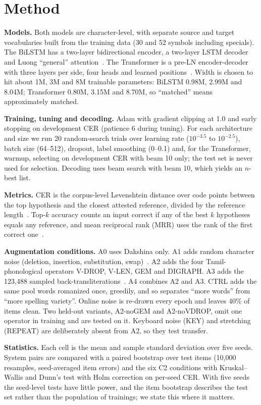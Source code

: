 \section{Method}
\label{sec:method}
\textbf{Models.}
Both models are character-level, with separate source and target vocabularies built from the training data (30 and 52 symbols including specials).
The BiLSTM has a two-layer bidirectional encoder, a two-layer LSTM decoder and Luong ``general'' attention~\cite{luong2015effective,bahdanau2015neural}.
The Transformer is a pre-LN encoder-decoder with three layers per side, four heads and learned positions~\cite{vaswani2017attention}.
Width is chosen to hit about 1M, 3M and 8M trainable parameters: BiLSTM 0.98M, 2.99M and 8.04M; Transformer 0.80M, 3.15M and 8.70M, so ``matched'' means approximately matched.

\textbf{Training, tuning and decoding.}
Adam with gradient clipping at 1.0 and early stopping on development CER (patience 6 during tuning).
For each architecture and size we run 20 random-search trials over learning rate ($10^{-3.5}$ to $10^{-2.5}$), batch size (64--512), dropout, label smoothing (0--0.1) and, for the Transformer, warmup, selecting on development CER with beam 10 only; the test set is never used for selection.
Decoding uses beam search with beam 10, which yields an $n$-best list.

\textbf{Metrics.}
CER is the corpus-level Levenshtein distance over code points between the top hypothesis and the closest attested reference, divided by the reference length~\cite{roark2020dakshina,kirov2024context}.
Top-$k$ accuracy counts an input correct if any of the best $k$ hypotheses equals any reference, and mean reciprocal rank (MRR) uses the rank of the first correct one~\cite{chen2018news}.

\textbf{Augmentation conditions.}
A0 uses Dakshina only.
A1 adds random character noise (deletion, insertion, substitution, swap)~\cite{karpukhin2019training}.
A2 adds the four Tamil-phonological operators V-DROP, V-LEN, GEM and DIGRAPH.
A3 adds the 123{,}488 sampled back-transliterations~\cite{sennrich2016backtranslation}.
A4 combines A2 and A3.
CTRL adds the same pool words romanized once, greedily, and so separates ``more words'' from ``more spelling variety''.
Online noise is re-drawn every epoch and leaves 40\% of items clean.
Two held-out variants, A2-noGEM and A2-noVDROP, omit one operator in training and are tested on it.
Keyboard noise (KEY) and stretching (REPEAT) are deliberately absent from A2, so they test transfer.

\textbf{Statistics.}
Each cell is the mean and sample standard deviation over five seeds.
System pairs are compared with a paired bootstrap over test items (10{,}000 resamples, seed-averaged item errors) and the six C2 conditions with Kruskal--Wallis and Dunn's test with Holm correction on per-seed CER.
With five seeds the seed-level tests have little power, and the item bootstrap describes the test set rather than the population of trainings; we state this where it matters.
